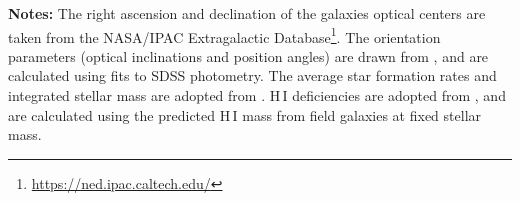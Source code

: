 \documentclass[longauth]{aa}
\begin{document}
\begin{table*}
\begin{minipage}{2.0\columnwidth}
    \vspace{1mm}
    {\bf Notes:} The right ascension and declination of the galaxies optical centers are taken from the NASA/IPAC Extragalactic Database\footnote{\url{https://ned.ipac.caltech.edu/}}. The orientation parameters (optical inclinations and position angles) are drawn from \citet{Brown2021}, and are calculated using fits to SDSS photometry. The average star formation rates and integrated stellar mass are adopted from \citet{Leroy2019}. H\,I deficiencies are adopted from \citet{Zabel2022}, and are calculated using the predicted H\,I mass from field galaxies at fixed stellar mass.
\end{minipage}

\label{tab:sample}
\end{table*}
\end{document}
